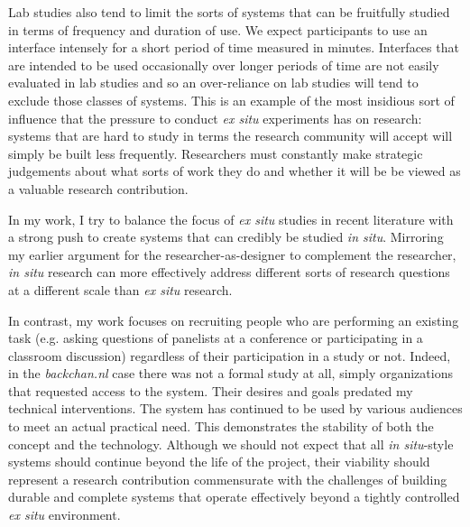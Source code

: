 Lab studies also tend to limit the sorts of systems that can be fruitfully studied in terms of frequency and duration of use. We expect participants to use an interface intensely for a short period of time measured in minutes. Interfaces that are intended to be used occasionally over longer periods of time are not easily evaluated in lab studies and so an over-reliance on lab studies will tend to exclude those classes of systems. This is an example of the most insidious sort of influence that the pressure to conduct \emph{ex situ} experiments has on research: systems that are hard to study in terms the research community will accept will simply be built less frequently. Researchers must constantly make strategic judgements about what sorts of work they do and whether it will be be viewed as a valuable research contribution. 

In my work, I try to balance the focus of \emph{ex situ} studies in recent literature with a strong push to create systems that can credibly be studied \emph{in situ}. Mirroring my earlier argument for the researcher-as-designer to complement the researcher, \emph{in situ} research can more effectively address different sorts of research questions at a different scale than \emph{ex situ} research.





In contrast, my work focuses on recruiting people who are performing an existing task (e.g. asking questions of panelists at a conference or participating in a classroom discussion) regardless of their participation in a study or not. Indeed, in the \emph{backchan.nl} case there was not a formal study at all, simply organizations that requested access to the system. Their desires and goals predated my technical interventions. The system has continued to be used by various audiences to meet an actual practical need. This demonstrates the stability of both the concept and the technology. Although we should not expect that all \emph{in situ}-style systems should continue beyond the life of the project, their viability should represent a research contribution commensurate with the challenges of building durable and complete systems that operate effectively beyond a tightly controlled \emph{ex situ} environment.


